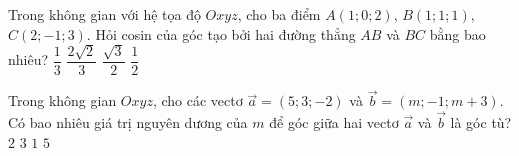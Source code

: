 \begin{ex}%
	Trong không gian với hệ tọa độ $Oxyz$, cho ba điểm $A(1;0;2)$, $B(1;1;1)$, $C(2;-1;3)$. Hỏi cosin của góc tạo bởi hai đường thẳng $A B$ và $B C$ bằng bao nhiêu? 
	\choice 
		{$\dfrac{1}{3}$} 
		{$\dfrac{2  \sqrt{2}}{3}$}
		{$\dfrac{\sqrt{3}}{2}$} 
		{$\dfrac{1}{2}$} 
\end{ex}

\begin{ex}%
	Trong không gian $Oxyz$, cho các vectơ $\overrightarrow{a}=(5;3;-2)$ và $\overrightarrow{b}=(m;-1;m+3)$. Có bao nhiêu giá trị nguyên dương  của $m$ để góc giữa hai vectơ $\overrightarrow{a}$ và $\overrightarrow{b}$ là góc tù?
	 \choice
		 {\True $2$}
		 {$3$}
		 {$1$}
		{$5$} 
\end{ex}

